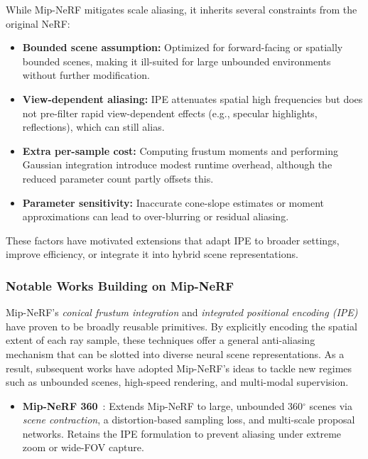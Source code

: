 \begin{enrichment}
\begin{enrichment}
    While Mip-NeRF mitigates scale aliasing, it inherits several constraints from the original NeRF:
    \begin{itemize}
        \item \textbf{Bounded scene assumption:} Optimized for forward-facing or spatially bounded scenes, making it ill-suited for large unbounded environments without further modification.
        \item \textbf{View-dependent aliasing:} IPE attenuates spatial high frequencies but does not pre-filter rapid view-dependent effects (e.g., specular highlights, reflections), which can still alias.
        \item \textbf{Extra per-sample cost:} Computing frustum moments and performing Gaussian integration introduce modest runtime overhead, although the reduced parameter count partly offsets this.
        \item \textbf{Parameter sensitivity:} Inaccurate cone-slope estimates or moment approximations can lead to over-blurring or residual aliasing.
    \end{itemize}
    
    These factors have motivated extensions that adapt IPE to broader settings, improve efficiency, or integrate it into hybrid scene representations.
    
    \subsubsection{Notable Works Building on Mip-NeRF}
    \label{subsec:chapter23_mipnerf_influence}
    
    Mip-NeRF’s \emph{conical frustum integration} and \emph{integrated positional encoding (IPE)} have proven to be broadly reusable primitives.  
    By explicitly encoding the spatial extent of each ray sample, these techniques offer a general anti-aliasing mechanism that can be slotted into diverse neural scene representations.
    As a result, subsequent works have adopted Mip-NeRF’s ideas to tackle new regimes such as unbounded scenes, high-speed rendering, and multi-modal supervision.
    
    \begin{itemize}
        \item \textbf{Mip-NeRF 360}~\cite{barron2022_mipnerf360}: Extends Mip-NeRF to large, unbounded 360$^\circ$ scenes via \emph{scene contraction}, a distortion-based sampling loss, and multi-scale proposal networks. Retains the IPE formulation to prevent aliasing under extreme zoom or wide-FOV capture.
        

\end{itemize}
\end{enrichment}
\end{enrichment}
